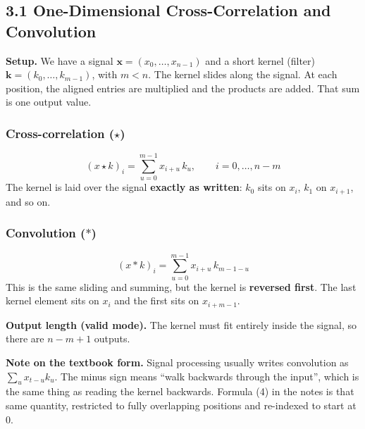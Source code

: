 
\subsection*{3.1 One-Dimensional Cross-Correlation and Convolution}

\textbf{Setup.} We have a signal $\mathbf{x} = (x_0, \ldots, x_{n-1})$ and a short kernel (filter) $\mathbf{k} = (k_0, \ldots, k_{m-1})$, with $m < n$. The kernel slides along the signal. At each position, the aligned entries are multiplied and the products are added. That sum is one output value.

\subsubsection*{Cross-correlation ($\star$)}
\[
(x \star k)_i = \sum_{u=0}^{m-1} x_{i+u}\, k_u, \qquad i = 0, \ldots, n-m
\]
The kernel is laid over the signal \textbf{exactly as written}: $k_0$ sits on $x_i$, $k_1$ on $x_{i+1}$, and so on.

\subsubsection*{Convolution ($*$)}
\[
(x * k)_i = \sum_{u=0}^{m-1} x_{i+u}\, k_{m-1-u}
\]
This is the same sliding and summing, but the kernel is \textbf{reversed first}. The last kernel element sits on $x_i$ and the first sits on $x_{i+m-1}$.

\textbf{Output length (valid mode).} The kernel must fit entirely inside the signal, so there are $n - m + 1$ outputs.

\textbf{Note on the textbook form.} Signal processing usually writes convolution as $\sum_u x_{t-u} k_u$. The minus sign means ``walk backwards through the input'', which is the same thing as reading the kernel backwards. Formula (4) in the notes is that same quantity, restricted to fully overlapping positions and re-indexed to start at 0.

